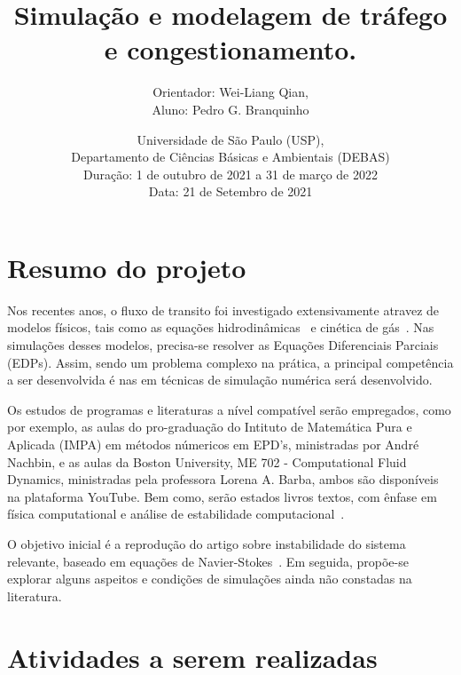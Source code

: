 \documentclass[12pt, brazilian]{article}
\author{Orientador: Wei-Liang Qian, \\ Aluno: Pedro G. Branquinho}
\date{\vspace{4cm}Universidade de São Paulo (USP), \vspace{0.3cm} \\ Departamento de Ciências Básicas e Ambientais (DEBAS)\vspace{2cm}\\ Duração: 1 de outubro de 2021 a 31 de março de 2022 \vspace{0.3cm}\\
  Data: 21 de Setembro de 2021}
\title{Simulação e modelagem de tráfego e congestionamento.\vspace{3cm}}
\begin{document}
\maketitle
\clearpage

\tableofcontents
\clearpage


\section{Resumo do projeto}
\label{sec:orgf619300}
Nos recentes anos, o fluxo de transito foi investigado extensivamente atravez de modelos físicos, tais como as equações hidrodinâmicas~\cite{kerner1993cluster} e cinética de gás~\cite{bando1995dynamical}. 
Nas simulações desses modelos, precisa-se resolver as Equações Diferenciais Parciais (EDPs). 
Assim, sendo um problema complexo na prática, a principal competência a ser desenvolvida é nas em técnicas de simulação numérica será desenvolvido.

Os estudos de programas e literaturas a nível compatível serão empregados, como por exemplo, as aulas do pro-graduação do Intituto de Matemática Pura e Aplicada (IMPA) em métodos númericos em EPD's, ministradas por André Nachbin, 
e as aulas da Boston University, ME 702 - Computational Fluid Dynamics, ministradas pela professora Lorena A. Barba, ambos são disponíveis na plataforma YouTube. 
Bem como, serão estados livros textos, com ênfase em física computational e análise de estabilidade computacional~\cite{press1986numerical}.

O objetivo inicial é a reprodução do artigo sobre instabilidade do sistema relevante, baseado em equações de Navier-Stokes~\cite{kerner1993cluster}. 
Em seguida, propõe-se explorar alguns aspeitos e condições de simulações ainda não constadas na literatura.

\section{Atividades a serem realizadas}
\label{sec:orgd0f4673}
\end{document}
